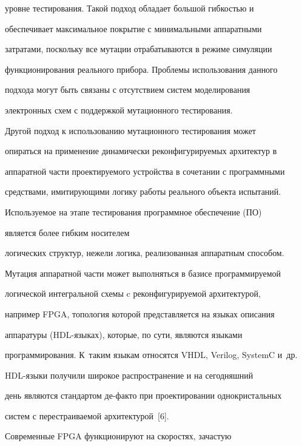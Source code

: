 уровне тестирования. Такой подход обладает большой гибкостью и


обеспечивает максимальное покрытие с минимальными аппаратными


затратами, поскольку все мутации отрабатываются в режиме симуляции


функционирования реального прибора. Проблемы использования данного


подхода могут быть связаны с отсутствием систем моделирования


электронных схем с поддержкой мутационного тестирования.





    Другой подход к использованию мутационного тестирования может


опираться на применение динамически реконфигурируемых архитектур в


аппаратной части проектируемого устройства в сочетании с программными


средствами, имитирующими логику работы реального объекта испытаний.


Используемое на этапе тестирования программное обеспечение (ПО)


является более гибким носителем


логических структур, нежели логика, реализованная аппаратным способом.


Мутация аппаратной части может выполняться в базисе программируемой


логической интегральной схемы c реконфигурируемой архитектурой,


например FPGA, топология которой представляется на языках описания


аппаратуры (HDL-язы\-ках), которые, по сути, являются языками


программирования. К~таким языкам относятся VHDL, Verilog, SystemC и~др.


HDL-язы\-ки получили широкое распространение и на сегодняшний


день являются стандартом де-фак\-то при проектировании од\-но\-крис\-таль\-ных


систем с перестраиваемой архитектурой~[6].


{





}





    Современные FPGA функционируют на скоростях, зачастую


